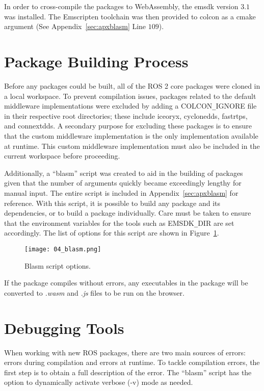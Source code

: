    In order to cross-compile the packages to WebAssembly, the \ac{emsdk} version $3.1$ was installed. The Emscripten toolchain was then provided to \textsf{colcon} as a \textsf{cmake} argument (See Appendix~\ref{sec:apxblasm} Line $109$).


\section{Package Building Process}

    Before any packages could be built, all of the ROS 2 core packages were cloned in a local workspace. To prevent compilation issues, packages related to the default middleware implementations were excluded by adding a \textsf{COLCON}\texttt{\_}\textsf{IGNORE} file in their respective root directories; these include \textsf{iceoryx}, \textsf{cyclonedds}, \textsf{fastrtps}, and \textsf{connextdds}. A secondary purpose for excluding these packages is to ensure that the custom middleware implementation is the only implementation available at runtime. This custom middleware implementation must also be included in the current workspace before proceeding. 

    Additionally, a ``blasm'' script was created to aid in the building of packages given that the number of arguments quickly became exceedingly lengthy for manual input. The entire script is included in Appendix~\ref{sec:apxblasm} for reference. With this script, it is possible to build any package and its dependencies, or to build a package individually. Care must be taken to ensure that the environment variables for the tools such as \textsf{EMSDK}\texttt{\_}\textsf{DIR} are set accordingly. The list of options for this script are shown in Figure~\ref{fig:blasm}.

    \begin{figure}[htbp]
        \centering
        \texttt{[image: 04\_blasm.png]}
        \caption{Blasm script options.}
        \label{fig:blasm}
    \end{figure}


    If the package compiles without errors, any executables in the package will be converted to \textit{.wasm} and \textit{.js} files to be run on the browser.


\section{Debugging Tools}

    When working with new ROS packages, there are two main sources of errors: errors during compilation and errors at runtime. To tackle compilation errors, the first step is to obtain a full description of the error. The ``blasm'' script has the option to dynamically activate verbose (\textsf{-v}) mode as needed.


